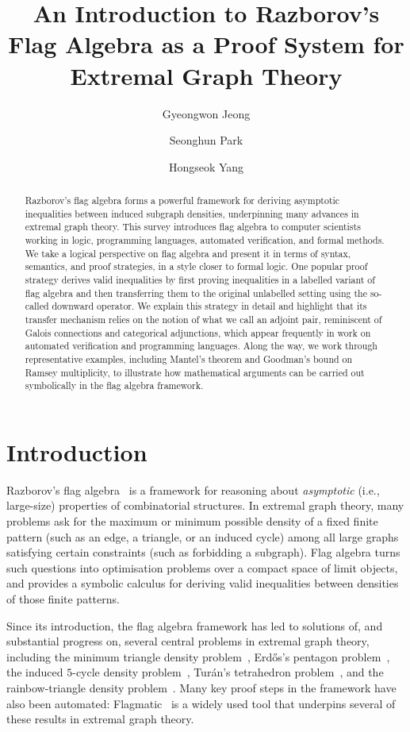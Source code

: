 \documentclass{article}
\title{An Introduction to Razborov's Flag Algebra as a Proof System for Extremal Graph Theory}
\date{}
\author[1]{Gyeongwon Jeong}
\affil[1]{School of Computing, KAIST, South Korea,
  \texttt{jgyw0910@kaist.ac.kr}}
\author[2]{Seonghun Park}
\affil[2]{School of Computing, KAIST, South Korea,
  \texttt{hun57@kaist.ac.kr}}
\author[3]{Hongseok Yang}
\affil[3]{School of Computing, KAIST, South Korea,
  \texttt{hongseok00@gmail.com}}
\begin{document}
\maketitle

\begin{abstract}
Razborov's flag algebra forms a powerful framework for deriving asymptotic inequalities between induced subgraph densities, underpinning many advances in extremal graph theory. This survey introduces flag algebra to computer scientists working in logic, programming languages, automated verification, and formal methods. We take a logical perspective on flag algebra and present it in terms of syntax, semantics, and proof strategies, in a style closer to formal logic. One popular proof strategy derives valid inequalities by first proving inequalities in a labelled variant of flag algebra and then transferring them to the original unlabelled setting using the so-called downward operator. We explain this strategy in detail and highlight that its transfer mechanism relies on the notion of what we call an adjoint pair, reminiscent of Galois connections and categorical adjunctions, which appear frequently in work on automated verification and programming languages. Along the way, we work through representative examples, including Mantel's theorem and Goodman's bound on Ramsey multiplicity, to illustrate how mathematical arguments can be carried out symbolically in the flag algebra framework.
\end{abstract}

\section{Introduction}

Razborov's flag algebra~\cite{Razborov2007} is a framework for reasoning about
\emph{asymptotic} (i.e., large-size) properties of combinatorial structures.
In extremal graph theory, many problems ask for the maximum or minimum possible density
of a fixed finite pattern (such as an edge, a triangle, or an induced cycle) among all large
graphs satisfying certain constraints (such as forbidding a subgraph).  Flag algebra turns
such questions into optimisation problems over a compact space of limit objects, and provides
a symbolic calculus for deriving valid inequalities between densities of those finite patterns.

Since its introduction, the flag algebra framework has led to solutions of, and substantial progress on,
several central problems in extremal graph theory, including the minimum triangle density
problem~\cite{Razborov2008}, Erd\H{o}s's pentagon problem~\cite{HatamiHKNR13,Grzesik12},
the induced $5$-cycle density problem~\cite{BaloghHLP16}, Tur\'an's tetrahedron
problem~\cite{Razborov10,BaberT12}, and the rainbow-triangle density
problem~\cite{BaloghHLPVY17}. Many key proof steps in the framework have also been automated:
{\sc Flagmatic}~\cite{Falgas-RavryV13,PikhurkoST19} is a widely used tool that underpins
several of these results in extremal graph theory.
\end{document}

